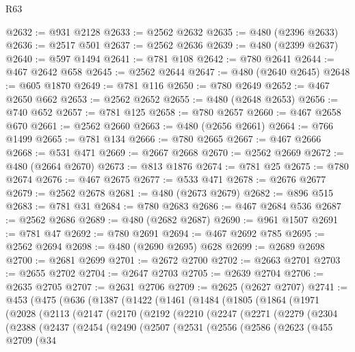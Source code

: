 \begin{lexlean}{R63}
\begin{coremodule}
@2632 := @931 @2128
@2633 := @2562 @2632
@2635 := @480 (@2396 @2633)
@2636 := @2517 @501
@2637 := @2562 @2636
@2639 := @480 (@2399 @2637)
@2640 := @597 @1494
@2641 := @781 @108
@2642 := @780 @2641
@2644 := @467 @2642 @658
@2645 := @2562 @2644
@2647 := @480 (@2640 @2645)
@2648 := @605 @1870
@2649 := @781 @116
@2650 := @780 @2649
@2652 := @467 @2650 @662
@2653 := @2562 @2652
@2655 := @480 (@2648 @2653)
@2656 := @740 @652
@2657 := @781 @125
@2658 := @780 @2657
@2660 := @467 @2658 @670
@2661 := @2562 @2660
@2663 := @480 (@2656 @2661)
@2664 := @766 @1499
@2665 := @781 @134
@2666 := @780 @2665
@2667 := @467 @2666
@2668 := @531 @471
@2669 := @2667 @2668
@2670 := @2562 @2669
@2672 := @480 (@2664 @2670)
@2673 := @813 @1876
@2674 := @781 @25
@2675 := @780 @2674
@2676 := @467 @2675
@2677 := @533 @471
@2678 := @2676 @2677
@2679 := @2562 @2678
@2681 := @480 (@2673 @2679)
@2682 := @896 @515
@2683 := @781 @31
@2684 := @780 @2683
@2686 := @467 @2684 @536
@2687 := @2562 @2686
@2689 := @480 (@2682 @2687)
@2690 := @961 @1507
@2691 := @781 @47
@2692 := @780 @2691
@2694 := @467 @2692 @785
@2695 := @2562 @2694
@2698 := @480 (@2690 @2695) @628
@2699 := @2689 @2698
@2700 := @2681 @2699
@2701 := @2672 @2700
@2702 := @2663 @2701
@2703 := @2655 @2702
@2704 := @2647 @2703
@2705 := @2639 @2704
@2706 := @2635 @2705
@2707 := @2631 @2706
@2709 := @2625 (@2627 @2707)
@2741 := @453
    (@475
      (@636
        (@1387
          (@1422
            (@1461
              (@1484
                (@1805
                  (@1864
                    (@1971
                      (@2028
                        (@2113
                          (@2147
                            (@2170
                              (@2192
                                (@2210
                                  (@2247
                                    (@2271
                                      (@2279
                                        (@2304
                                          (@2388
                                            (@2437
                                              (@2454
                                                (@2490
                                                  (@2507
                                                    (@2531
                                                      (@2556
                                                        (@2586
                                                          (@2623
                                                            (@455
                                                              @2709
                                                              (@34

\end{coremodule}
\end{lexlean}
